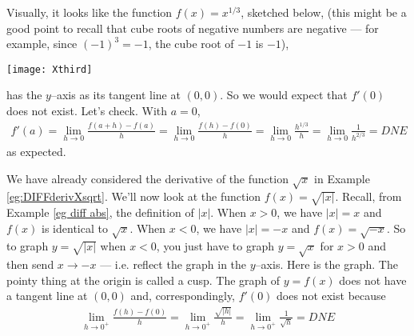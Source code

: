 \begin{eg}[$\diff{}{x}x^{1/3}$]\label{eg:DIFFderivXthird}
Visually, it looks like the function $f(x) = x^{1/3}$, sketched below,
(this might be a good point to recall that cube roots of negative
numbers are negative --- for example, since $(-1)^3=-1$, the
cube root of $-1$ is $-1$),
\begin{efig}
  \begin{center}
  \texttt{[image: Xthird]}
  \end{center}
\end{efig}
has the $y$--axis as its tangent line at $(0,0)$. So we would
expect that $f'(0)$ does not exist. Let's check. With $a=0$,
\begin{align*}
f'(a)= \lim_{h\rightarrow 0}\frac{f(a+h)-f(a)}{h}
=\lim_{h\rightarrow 0}\frac{f(h)-f(0)}{h}
 =\lim_{h\rightarrow 0}\frac{h^{1/3}}{h}
 =\lim_{h\rightarrow 0}\frac{1}{h^{2/3}}
 =DNE
\end{align*}
as expected.

\end{eg}
\begin{eg}\label{eg:DIFFderivCusp}
We have already considered the derivative of the function
$\sqrt{x}$ in Example \ref{eg:DIFFderivXsqrt}.
We'll now look at the function $f(x) = \sqrt{|x|}$.
Recall, from Example \ref{eg diff abs}, the definition of $|x|$.
When $x>0$, we have $|x|=x$ and $f(x)$ is identical to $\sqrt{x}$.
When $x<0$, we have $|x|=-x$ and $f(x)=\sqrt{-x}$. So to graph
$y=\sqrt{|x|}$ when $x<0$, you just have to graph $y=\sqrt{x}$
for $x>0$ and then send $x\rightarrow -x$ --- i.e. reflect the
graph in the $y$--axis. Here is the graph.
The pointy thing at the origin is called a cusp. The graph of
$y=f(x)$ does not have a tangent line at $(0,0)$ and, correspondingly,
$f'(0)$ does not exist because
\begin{align*}
\lim_{h\rightarrow 0^+}\frac{f(h)-f(0)}{h}
 =\lim_{h\rightarrow 0^+}\frac{\sqrt{|h|}}{h}
 =\lim_{h\rightarrow 0^+}\frac{1}{\sqrt{h}}
 =DNE
\end{align*}
\end{eg}

